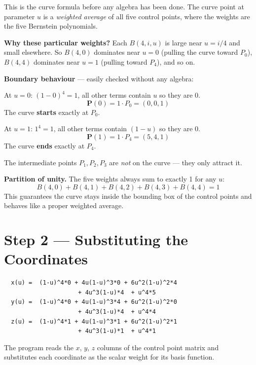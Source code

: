 \documentclass[12pt, a4paper]{article}
\begin{document}
This is the curve formula before any algebra has been done.
The curve point at parameter $u$ is a \emph{weighted average} of
all five control points, where the weights are the five Bernstein
polynomials.

\textbf{Why these particular weights?}
Each $B(4,i,u)$ is large near $u = i/4$ and small elsewhere.
So $B(4,0)$ dominates near $u=0$ (pulling the curve toward $P_0$),
$B(4,4)$ dominates near $u=1$ (pulling toward $P_4$), and so on.

\begin{examplebox}
\textbf{Boundary behaviour} --- easily checked without any algebra:

\medskip
At $u = 0$: $(1-0)^4 = 1$, all other terms contain $u$ so they are 0.
\[
  \mathbf{P}(0) = 1 \cdot P_0 = (0, 0, 1)
\]
The curve \textbf{starts} exactly at $P_0$.

\medskip
At $u = 1$: $1^4 = 1$, all other terms contain $(1-u)$ so they are 0.
\[
  \mathbf{P}(1) = 1 \cdot P_4 = (5, 4, 1)
\]
The curve \textbf{ends} exactly at $P_4$.

\medskip
The intermediate points $P_1, P_2, P_3$ are \emph{not} on the curve ---
they only attract it.
\end{examplebox}

\begin{notebox}
\textbf{Partition of unity.}
The five weights always sum to exactly 1 for any $u$:
\[
  B(4,0) + B(4,1) + B(4,2) + B(4,3) + B(4,4) = 1
\]
This guarantees the curve stays inside the bounding box of the
control points and behaves like a proper weighted average.
\end{notebox}


\section{Step 2 --- Substituting the Coordinates}

\begin{verbatim}
  x(u) =  (1-u)^4*0 + 4u(1-u)^3*0 + 6u^2(1-u)^2*4
                     + 4u^3(1-u)*4  + u^4*5
  y(u) =  (1-u)^4*0 + 4u(1-u)^3*4 + 6u^2(1-u)^2*0
                     + 4u^3(1-u)*4  + u^4*4
  z(u) =  (1-u)^4*1 + 4u(1-u)^3*1 + 6u^2(1-u)^2*1
                     + 4u^3(1-u)*1  + u^4*1
\end{verbatim}

The program reads the $x$, $y$, $z$ columns of the control point
matrix and substitutes each coordinate as the scalar weight for
its basis function.
\end{document}
